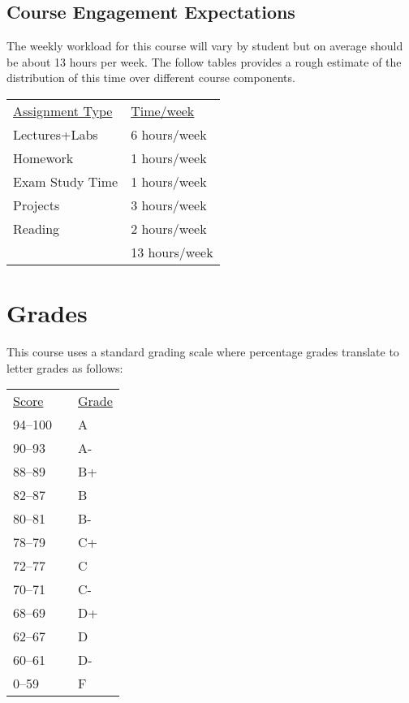\documentclass[10pt]{article}
\begin{document}
\subsection{Course Engagement Expectations}

The weekly workload for this course will vary by student but on average should be about 13 hours per week.  The follow tables provides a rough estimate of the distribution of this time over different course components.
\begin{center}
\begin{tabular}{ll}
\underline{Assignment Type} & \underline{Time/week} \\
Lectures+Labs       & 6 hours/week \\
Homework          & 1 hours/week \\
Exam Study Time    & 1 hours/week \\
Projects          & 3 hours/week \\
Reading &  2 hours/week \\
\bottomrule
 & 13 hours/week
\end{tabular}
\end{center}


\section{Grades}

This course uses a standard grading scale where percentage grades translate to letter grades as follows:

\begin{center}
\begin{small}
\begin{tabular}{lcl}
\underline{Score} & & \underline{Grade} \\
94--100 & & A \\
90--93 & & A- \\
88--89 & & B+ \\
82--87 & & B \\
80--81 & & B- \\
78--79 & & C+ \\
72--77 & & C \\
70--71 & & C- \\
68--69 & & D+ \\
62--67 & & D \\
60--61 & & D- \\
0--59 & & F
\end{tabular}
\end{small}
\end{center}
\end{document}
